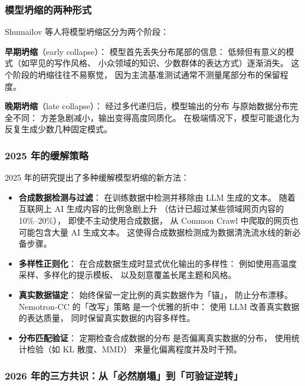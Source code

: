 \subsubsection{模型坍缩的两种形式}

Shumailov 等人将模型坍缩区分为两个阶段：

\textbf{早期坍缩}（early collapse）：
模型首先丢失分布尾部的信息：
低频但有意义的模式（如罕见的写作风格、
小众领域的知识、少数群体的表达方式）逐渐消失。
这个阶段的坍缩往往不易察觉，
因为主流基准测试通常不测量尾部分布的保留程度。

\textbf{晚期坍缩}（late collapse）：
经过多代递归后，模型输出的分布
与原始数据分布完全不同：
方差急剧减小，输出变得高度同质化。
在极端情况下，模型可能退化为
反复生成少数几种固定模式。

\subsubsection{2025 年的缓解策略}

2025 年的研究提出了多种缓解模型坍缩的新方法：

\begin{itemize}[noitemsep]
  \item \textbf{合成数据检测与过滤}：
        在训练数据中检测并移除由 LLM 生成的文本。
        随着互联网上 AI 生成内容的比例急剧上升
        （估计已超过某些领域网页内容的 10\%--20\%），
        即使不主动使用合成数据，
        从 Common Crawl 中爬取的网页也可能包含大量 AI 生成文本。
        这使得合成数据检测成为数据清洗流水线的新必备步骤。
  \item \textbf{多样性正则化}：
        在合成数据生成时显式优化输出的多样性：
        例如使用高温度采样、多样化的提示模板、
        以及刻意覆盖长尾主题和风格。
  \item \textbf{真实数据锚定}：
        始终保留一定比例的真实数据作为「锚」，
        防止分布漂移。Nemotron-CC 的「改写」策略
        是一个优雅的折中：
        使用 LLM 改善真实数据的表达质量，
        同时保留真实数据的内容多样性。
  \item \textbf{分布匹配验证}：
        定期检查合成数据的分布
        是否偏离真实数据的分布，
        使用统计检验（如 KL 散度、MMD）
        来量化偏离程度并及时干预。
\end{itemize}

\subsubsection{2026 年的三方共识：从「必然崩塌」到「可验证逆转」}


